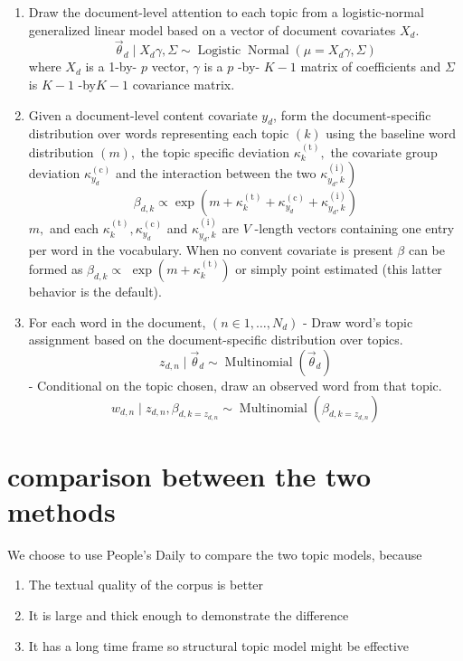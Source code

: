 \documentclass{article}
\begin{document}
\begin{enumerate}
  \item Draw the document-level attention to each topic from a logistic-normal generalized linear model based on a vector of document covariates $X_{d}$.
$$
\vec{\theta}_{d} \mid X_{d} \gamma, \Sigma \sim \operatorname{Logistic} \operatorname{Normal}\left(\mu=X_{d} \gamma, \Sigma\right)
$$
where $X_{d}$ is a 1-by- $p$ vector, $\gamma$ is a $p$ -by- $K-1$ matrix of coefficients and $\Sigma$ is $K-1$ -by$K-1$ covariance matrix. 
  \item Given a document-level content covariate $y_{d}$, form the document-specific distribution over words representing each topic $(k)$ using the baseline word distribution $(m),$ the topic specific deviation $\kappa_{k}^{(\mathrm{t})},$ the covariate group deviation $\kappa_{y_{d}}^{(\mathrm{c})}$ and the interaction between the two $\left.\kappa_{y_{d}, k}^{(\mathrm{i})}\right)$
$$
\beta_{d, k} \propto \exp \left(m+\kappa_{k}^{(\mathrm{t})}+\kappa_{y_{d}}^{(\mathrm{c})}+\kappa_{y_{d}, k}^{(\mathrm{i})}\right)
$$
$m,$ and each $\kappa_{k}^{(\mathrm{t})}, \kappa_{y_{d}}^{(\mathrm{c})}$ and $\kappa_{y_{d}, k}^{(\mathrm{i})}$ are $V$ -length vectors containing one entry per word in the vocabulary. When no convent covariate is present $\beta$ can be formed as $\beta_{d, k} \propto$ $\exp \left(m+\kappa_{k}^{(\mathrm{t})}\right)$ or simply point estimated (this latter behavior is the default).

  \item For each word in the document, $\left(n \in 1, \ldots, N_{d}\right)$
- Draw word's topic assignment based on the document-specific distribution over topics.
$$
z_{d, n} \mid \vec{\theta}_{d} \sim \operatorname{Multinomial}\left(\vec{\theta}_{d}\right)
$$
- Conditional on the topic chosen, draw an observed word from that topic.
$$
w_{d, n} \mid z_{d, n}, \beta_{d, k=z_{d, n}} \sim \operatorname{Multinomial}\left(\beta_{d, k=z_{d, n}}\right)
$$


\end{enumerate}


\section{comparison between the two methods}

We choose to use People's Daily to compare the two topic models, because 
\begin{enumerate}
  \item The textual quality of the corpus is better
  \item It is large and thick enough to demonstrate the difference 
  \item It has a long time frame so structural topic model might be effective
\end{enumerate}
\end{document}
